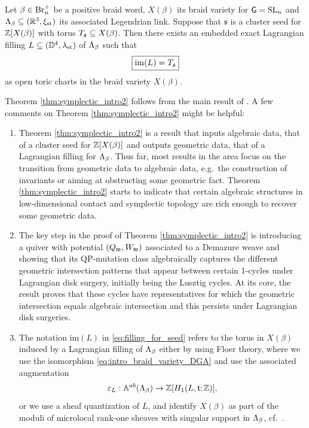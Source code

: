 \begin{fthm}\label{thm:symplectic_intro2}
Let $\beta\in\mbox{Br}_n^+$ be a positive braid word, $X(\beta)$ its braid variety for $\mathsf{G}=\operatorname{SL}_n$ and $\Lambda_\beta\subseteq(\mathbb{R}^3,\xi_{\text{st}})$ its associated Legendrian link. Suppose that $\mathfrak{s}$ is a cluster seed for $\mathbb{Z}[X(\beta)]$ with torus $T_\mathfrak{s}\subseteq X(\beta)$. Then there exists an embedded exact Lagrangian filling $L\subseteq(\mathbb{D}^4,\lambda_{\text{st}})$ of $\Lambda_\beta$ such that
\begin{equation}\label{eq:filling_for_seed}
\fbox{$\mbox{im}(L)=T_\mathfrak{s}$}
\end{equation}
as open toric charts in the braid variety $X(\beta)$.\\
\end{fthm}
\vspace{0.2cm}

Theorem \ref{thm:symplectic_intro2} follows from the main result of \cite{CasalsGao24}. A few comments on Theorem \ref{thm:symplectic_intro2} might be helpful:

\begin{enumerate}
    \item Theorem \ref{thm:symplectic_intro2} is a result that inputs algebraic data, that of a cluster seed for $\mathbb{Z}[X(\beta)]$ and outputs geometric data, that of a Lagrangian filling for $\Lambda_\beta$. Thus far, most results in the area focus on the transition from geometric data to algebraic data, e.g.~the construction of invariants or aiming at obstructing some geometric fact. Theorem \ref{thm:symplectic_intro2} starts to indicate that certain algebraic structures in low-dimensional contact and symplectic topology are rich enough to recover some geometric data.\\

    \item The key step in the proof of Theorem \ref{thm:symplectic_intro2} is introducing a quiver with potential $(Q_{\mathfrak{w}},W_{\mathfrak{w}})$ associated to a Demazure weave and showing that its QP-mutation class algebraically captures the different geometric intersection patterns that appear between certain 1-cycles under Lagrangian disk surgery, initially being the Lusztig cycles. At its core, the result proves that these cycles have representatives for which the geometric intersection equals algebraic intersection and this persists under Lagrangian disk surgeries.\\

    \item The notation $\mbox{im}(L)$ in \eqref{eq:filling_for_seed} refers to the torus in $X(\beta)$ induced by a Lagrangian filling of $\Lambda_\beta$ either by using Floer theory, where we use the isomorphism \eqref{eq:intro_braid_variety_DGA}
    and use the associated augmentation
    $$\varepsilon_{L}:\mathbb{A}^{ab}(\Lambda_\beta)\to\mathbb{Z}[H_1(L,\mathfrak{t};\mathbb{Z})],$$
    or we use a sheaf quantization of $L$, and identify $X(\beta)$ as part of the moduli of microlocal rank-one sheaves with singular support in $\Lambda_\beta$, cf.~.
\end{enumerate}

